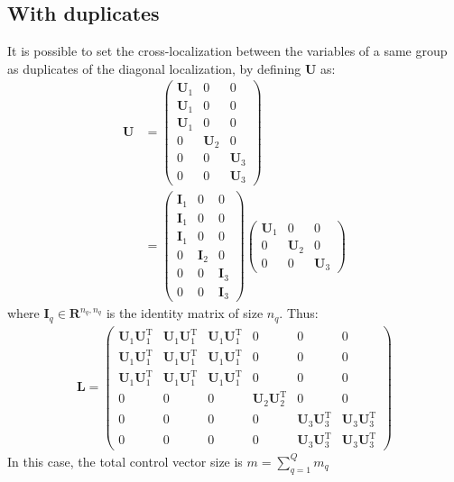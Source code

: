 \documentclass[12pt]{scrartcl}
\begin{document}
\subsection{With duplicates}
It is possible to set the cross-localization between the variables of a same group as duplicates of the diagonal localization, by defining $\mathbf{U}$ as: 
\begin{align}
\mathbf{U} & = \left( \begin{array}{c|c|c}
\mathbf{U}_1 & 0 & 0 \\
\mathbf{U}_1 & 0 & 0 \\
\mathbf{U}_1 & 0 & 0 \\[0.3ex]
\hline
0 & \mathbf{U}_2 & 0 \\[0.3ex]
\hline
0 & 0 & \mathbf{U}_3 \\
0 & 0 & \mathbf{U}_3
\end{array} \right) \nonumber \\
& = \left( \begin{array}{c|c|c}
\mathbf{I}_1 & 0 & 0 \\
\mathbf{I}_1 & 0 & 0 \\
\mathbf{I}_1 & 0 & 0 \\[0.3ex]
\hline
0 & \mathbf{I}_2 & 0 \\[0.3ex]
\hline
0 & 0 & \mathbf{I}_3 \\
0 & 0 & \mathbf{I}_3
\end{array} \right)
\left( \begin{array}{c|c|c}
\mathbf{U}_1 & 0 & 0 \\[0.3ex]
\hline
0 & \mathbf{U}_2 & 0 \\[0.3ex]
\hline
0 & 0 & \mathbf{U}_3
\end{array} \right)
\end{align}
where $\mathbf{I}_q \in \mathbf{R}^{n_q,n_q}$ is the identity matrix of size $n_q$. Thus:
\begin{align}
\mathbf{L} = \left( \begin{array}{ccc|c|cc}
\mathbf{U}_1 \mathbf{U}_1^\mathrm{T} & \mathbf{U}_1 \mathbf{U}_1^\mathrm{T} & \mathbf{U}_1 \mathbf{U}_1^\mathrm{T} & 0 & 0 & 0 \\
\mathbf{U}_1 \mathbf{U}_1^\mathrm{T} & \mathbf{U}_1 \mathbf{U}_1^\mathrm{T} & \mathbf{U}_1 \mathbf{U}_1^\mathrm{T} & 0 & 0 & 0 \\
\mathbf{U}_1 \mathbf{U}_1^\mathrm{T} & \mathbf{U}_1 \mathbf{U}_1^\mathrm{T} & \mathbf{U}_1 \mathbf{U}_1^\mathrm{T} & 0 & 0 & 0 \\[0.3ex]
\hline
0 & 0 & 0 & \mathbf{U}_2 \mathbf{U}_2^\mathrm{T} & 0 & 0 \\[0.3ex]
\hline
0 & 0 & 0 & 0 & \mathbf{U}_3 \mathbf{U}_3^\mathrm{T} & \mathbf{U}_3 \mathbf{U}_3^\mathrm{T} \\
0 & 0 & 0 & 0 & \mathbf{U}_3 \mathbf{U}_3^\mathrm{T} & \mathbf{U}_3 \mathbf{U}_3^\mathrm{T}
\end{array} \right)
\end{align}
In this case, the total control vector size is $\displaystyle m = \sum_{q=1}^Q m_q$
\end{document}
